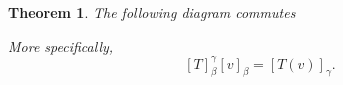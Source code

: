 \documentclass[12pt,letterpaper]{amsart}
\theoremstyle{plain}
\newtheorem{theorem}{Theorem}[section]
\theoremstyle{definition}
\numberwithin{equation}{section}
\begin{document}
\begin{theorem} The following diagram commutes\\
\begin{center}
\end{center}
More specifically, 
\[[T]_{\beta}^\gamma[v]_{\beta}=[T(v)]_{\gamma}.\]
\end{theorem}
\end{document}
